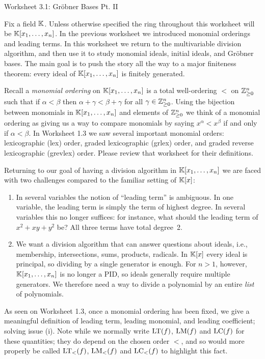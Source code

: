 \documentclass[Notebook.tex]{subfiles}
\begin{document}
\ifSubfilesClassLoaded{}{}


\begin{center}
    Worksheet 3.1: Gr\"obner Bases Pt. II
\end{center}

Fix a field $\mathbb K$. Unless otherwise specified the ring throughout this worksheet will be $\mathbb K[x_1,\ldots,x_n]$. In the previous worksheet we introduced monomial orderings and leading terms. In this worksheet we return to the multivariable division algorithm, and then use it to study monomial ideals, initial ideals, and Gr\"obner bases. The main goal is to push the story all the way to a major finiteness theorem: every ideal of $\mathbb K[x_1,\ldots,x_n]$ is finitely generated.

Recall a \emph{monomial ordering} on $\mathbb K[x_1,\ldots,x_n]$ is a total well-ordering $<$ on $\mathbb Z^{n}_{\geq0}$ such that if $\alpha < \beta$ then $\alpha + \gamma < \beta+\gamma$ for all $\gamma \in \mathbb Z^{n}_{\geq0}$. Using the bijection between monomials in $\mathbb K[x_1,\ldots,x_n]$  and elements of $\mathbb Z^{n}_{\geq0}$ we think of a monomial ordering as giving us a way to compare monomials by saying $x^{\alpha} < x^{\beta}$ if and only if $\alpha < \beta$. In Worksheet 1.3 we saw several important monomial orders: lexicographic (lex) order, graded lexicographic (grlex) order, and graded reverse lexicographic (grevlex) order. Please review that worksheet for their definitions. 

Returning to our goal of having a division algorithm in $\mathbb K[x_1,\ldots,x_n]$ we are faced with two challenges compared to the familiar setting of $\mathbb K[x]$: 
\begin{enumerate}[label=(\roman*),ref=\theenumi\roman*]
\item  In several variables the notion of ``leading term'' is ambiguous. In one variable, the leading term is simply the term of highest degree. In several variables this no longer suffices: for instance, what should the leading term of $x^2+xy+y^2$ be? All three terms have total degree~2.
\item  We want a division algorithm that can answer questions about ideals, i.e., membership, intersections, sums, products, radicals. In $\mathbb K[x]$ every ideal is principal, so dividing by a single generator is enough. For $n>1$, however, $\mathbb K[x_1,\ldots,x_n]$ is no longer a PID, so ideals generally require multiple generators. We therefore need a way to divide a polynomial by an entire \emph{list} of polynomials.
\end{enumerate}
As seen on Worksheet 1.3, once a monomial ordering has been fixed, we give a meaningful definition of leading term, leading monomial, and leading coefficient; solving issue (i). Note while we normally write $\text{LT}(f)$, $\text{LM}(f)$ and $\text{LC}(f)$ for these quantities; they do depend on the chosen order $<$, and so would more properly be called $\text{LT}_{<}(f)$, $\text{LM}_{<}(f)$ and $\text{LC}_{<}(f)$ to highlight this fact. 
\end{document}
